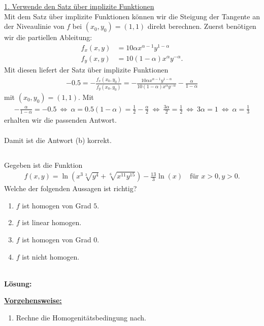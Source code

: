 \underline{1. Verwende den Satz über implizite Funktionen}\\
Mit dem Satz über implizite Funktionen können wir die Steigung der Tangente an der Niveaulinie von $ f $ bei $ (x_0,y_0) = (1,1) $ direkt berechnen.
Zuerst benötigen wir die partiellen Ableitung:
\begin{align*}
	f_x(x,y) &= 10 \alpha x^{\alpha - 1} y^{1- \alpha}\\
	f_y(x,y) &= 10 (1- \alpha ) x^\alpha y^{- \alpha}.
\end{align*}
Mit diesen liefert der Satz über implizite Funktionen
\begin{align*}
	-0.5 = - 
	\frac{f_x(x_0 ,y_0)}{f_y(x_0,y_0)}
	=
	-
	\frac{ 10 \alpha x^{\alpha - 1} y^{1- \alpha}}{10 (1- \alpha ) x^\alpha y^{- \alpha}}
	- \frac{\alpha}{1- \alpha}
\end{align*}
mit $ (x_0,y_0) = (1,1) $. Mit 
\begin{align*}
	- \frac{\alpha}{1- \alpha} = -0.5
	\ \Leftrightarrow \
	\alpha = 0.5 (1- \alpha ) = \frac{1}{2} - \frac{\alpha}{2}
	\ \Leftrightarrow \
	\frac{3 \alpha } {2} = \frac{1}{2}
	\ \Leftrightarrow \
	3 \alpha = 1 
	\ \Leftrightarrow \
	\alpha = \frac{1}{3}
\end{align*}
erhalten wir die passenden Antwort.\\
\\
Damit ist die Antwort (b) korrekt.



\newpage



\subsection*{}
Gegeben ist die Funktion
\begin{align*}
	f(x,y) 
	=
	\ln\left(
	x^3 \sqrt[3]{y^4} + \sqrt[6]{x^{11} y^{15}}
	\right)
	- \frac{13}{3} \ln(x) \quad \textrm{für } x>0,y>0.
\end{align*}
Welche der folgenden Aussagen ist richtig?
\renewcommand{\labelenumi}{(\alph{enumi})}
\begin{enumerate}
	\item
	$ f  $ ist homogen von Grad $ 5 $.
	\item
	$ f $ ist linear homogen.	
	\item 
	$ f  $ ist homogen von Grad $ 0 $.
	\item
	$ f $ ist nicht homogen.
\end{enumerate}
\ \\
\textbf{Lösung:}
\begin{mdframed}
\underline{\textbf{Vorgehensweise:}}
\renewcommand{\labelenumi}{\theenumi.}
\begin{enumerate}
\item Rechne die Homogenitätsbedingung nach.
\end{enumerate}
\end{mdframed}

